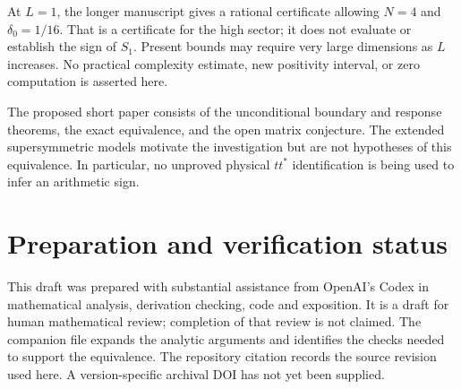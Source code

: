 At $L=1$, the longer manuscript gives a rational certificate allowing
$N=4$ and $\delta_0=1/16$. That is a certificate for the high sector; it
does not evaluate or establish the sign of $S_1$. Present bounds may require
very large dimensions as $L$ increases. No practical complexity estimate,
new positivity interval, or zero computation is asserted here.

The proposed short paper consists of the unconditional boundary and response
theorems, the exact equivalence, and the open matrix conjecture. The extended
supersymmetric models motivate the investigation but are not hypotheses of
this equivalence. In particular, no unproved physical $tt^*$ identification
is being used to infer an arithmetic sign.

\section*{Preparation and verification status}
This draft was prepared with substantial assistance from OpenAI's Codex in
mathematical analysis, derivation checking, code and exposition. It is a draft
for human mathematical review; completion of that review is not claimed.
The companion file expands the analytic arguments and identifies the checks
needed to support the equivalence. The repository citation records the source
revision used here. A version-specific archival DOI has not yet been supplied.



